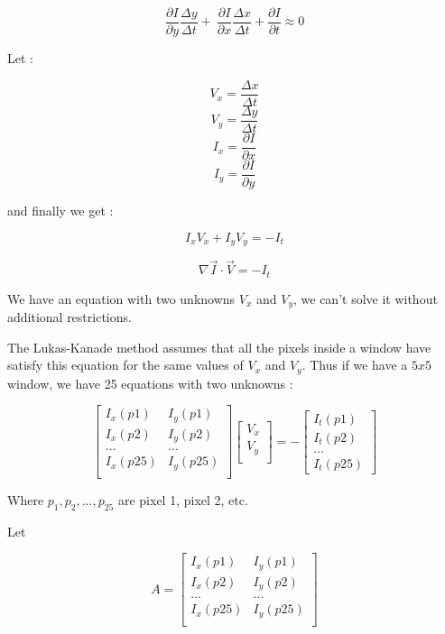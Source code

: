 $$ \frac{\partial I}{\partial y} \frac{\Delta y}{\Delta t} + \
 \frac{\partial I}{\partial x} \frac{\Delta x}{\Delta t}  + \frac{\partial I}{\partial t}  \approx 0 $$


Let :

$$ V_x = \frac{\Delta x}{\Delta t} $$
$$ V_y = \frac{\Delta y}{\Delta t} $$
$$ I_x = \frac{\partial I}{\partial x}$$
$$ I_y = \frac{\partial I}{\partial y}$$

and finally we get :

$$ I_x V_x + I_y V_y = -I_t $$

\begin{equation}
\label{eq:oflowgeneral}
\nabla{\vec{I}} \cdot \vec{V} = -I_t
\end{equation}

We have an equation with two unknowns $V_x$ and $V_y$, we can't solve it without additional restrictions.

The Lukas-Kanade method assumes that all the pixels inside a window have satisfy this equation for the same 
values of $V_x$ and $V_y$. Thus if we have a $5x5$ window, we have 25 equations with two unknowns :

$$
\begin{bmatrix}
I_x(p1) & I_y(p1) \\
I_x(p2) & I_y(p2) \\
... & ... \\
I_x(p25) & I_y(p25)\\
\end{bmatrix}  
\begin{bmatrix}
V_x \\
V_y\\
\end{bmatrix}
=
-\begin{bmatrix}
I_t(p1) \\
I_t(p2) \\
...     \\
I_t(p25) 
\end{bmatrix}
$$

Where $p_1, p_2, ..., p_25$ are pixel 1, pixel 2, etc.

Let 

$$
A = 
\begin{bmatrix}
I_x(p1) & I_y(p1) \\
I_x(p2) & I_y(p2) \\
... & ... \\
I_x(p25) & I_y(p25)\\
\end{bmatrix}  
$$

